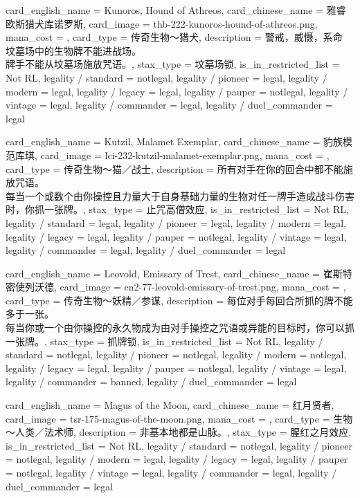 \documentclass[lang = cn, color = black, 10pt]{AllThatStax}
\begin{document}
\card
{
	card_english_name = {Kunoros, Hound of Athreos},
	card_chinese_name = {雅睿欧斯猎犬库诺罗斯},
	card_image = thb-222-kunoros-hound-of-athreos.png,
	mana_cost = ,
	card_type = 传奇生物～猎犬,
	description = {警戒，威慑，系命\\
坟墓场中的生物牌不能进战场。\\
牌手不能从坟墓场施放咒语。},
	stax_type = 坟墓场锁,
	is_in_restricted_list = Not RL,
	legality / standard = notlegal,
	legality / pioneer = legal,
	legality / modern = legal,
	legality / legacy = legal,
	legality / pauper = notlegal,
	legality / vintage = legal,
	legality / commander = legal,
	legality / duel_commander = legal
}

\card
{
	card_english_name = {Kutzil, Malamet Exemplar},
	card_chinese_name = {豹族模范库琪},
	card_image = lci-232-kutzil-malamet-exemplar.png,
	mana_cost = ,
	card_type = 传奇生物～猫／战士,
	description = {所有对手在你的回合中都不能施放咒语。\\
每当一个或数个由你操控且力量大于自身基础力量的生物对任一牌手造成战斗伤害时，你抓一张牌。},
	stax_type = 止咒高僧效应,
	is_in_restricted_list = Not RL,
	legality / standard = legal,
	legality / pioneer = legal,
	legality / modern = legal,
	legality / legacy = legal,
	legality / pauper = notlegal,
	legality / vintage = legal,
	legality / commander = legal,
	legality / duel_commander = legal
}

\card
{
	card_english_name = {Leovold, Emissary of Trest},
	card_chinese_name = {崔斯特密使列沃德},
	card_image = cn2-77-leovold-emissary-of-trest.png,
	mana_cost = ,
	card_type = 传奇生物～妖精／参谋,
	description = {每位对手每回合所抓的牌不能多于一张。\\
每当你或一个由你操控的永久物成为由对手操控之咒语或异能的目标时，你可以抓一张牌。},
	stax_type = 抓牌锁,
	is_in_restricted_list = Not RL,
	legality / standard = notlegal,
	legality / pioneer = notlegal,
	legality / modern = notlegal,
	legality / legacy = legal,
	legality / pauper = notlegal,
	legality / vintage = legal,
	legality / commander = banned,
	legality / duel_commander = legal
}

\card
{
	card_english_name = {Magus of the Moon},
	card_chinese_name = {红月贤者},
	card_image = tsr-175-magus-of-the-moon.png,
	mana_cost = ,
	card_type = 生物 ～人类／法术师,
	description = {非基本地都是山脉。},
	stax_type = 腥红之月效应,
	is_in_restricted_list = Not RL,
	legality / standard = notlegal,
	legality / pioneer = notlegal,
	legality / modern = legal,
	legality / legacy = legal,
	legality / pauper = notlegal,
	legality / vintage = legal,
	legality / commander = legal,
	legality / duel_commander = legal
}
\end{document}
